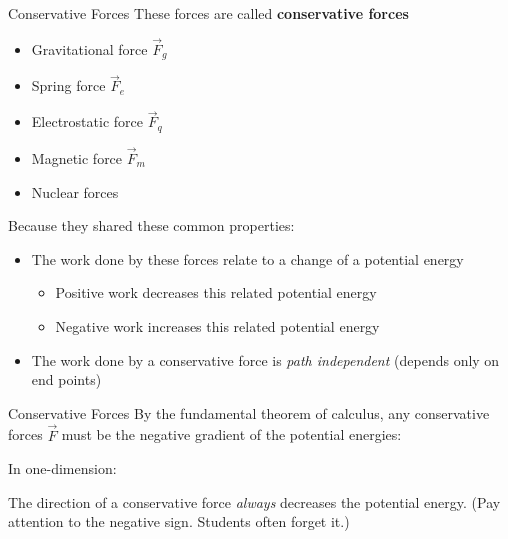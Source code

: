 \documentclass[12pt,compress,aspectratio=169]{beamer}
\begin{document}
\begin{frame}{Conservative Forces}
  These forces are called \textbf{conservative forces}
  \begin{itemize}
  \item Gravitational force $\vec F_g$
  \item Spring force $\vec F_e$
  \item Electrostatic force $\vec F_q$
  \item Magnetic force $\vec F_m$
  \item Nuclear forces
  \end{itemize}
  Because they shared these common properties:
  \begin{itemize}
  \item The work done by these forces relate to a change of a potential energy
    \begin{itemize}
    \item Positive work decreases this related potential energy
    \item Negative work increases this related potential energy
    \end{itemize}
  \item The work done by a conservative force is \emph{path independent}
    (depends only on end points)
  \end{itemize}
\end{frame}



\begin{frame}{Conservative Forces}
  By the fundamental theorem of calculus, any conservative forces $\vec F$
  must be the negative gradient of the potential energies:


  In one-dimension:


  The direction of a conservative force \emph{always} decreases the potential
  energy. (Pay attention to the negative sign. Students often forget it.)
\end{frame}
\end{document}
